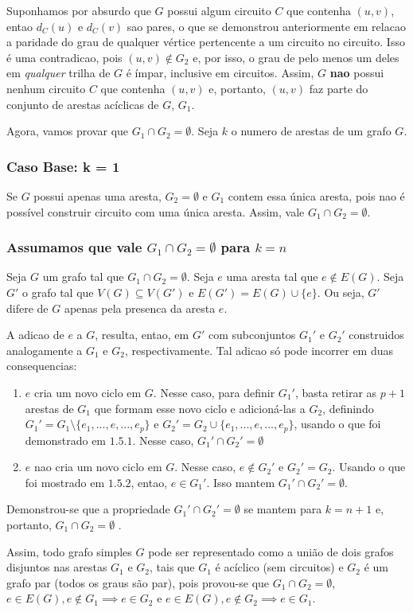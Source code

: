 \documentclass{article}
\begin{document}
Suponhamos por absurdo que $G$ possui algum circuito $C$ que contenha $(u,v)$, entao $d_C(u)$ e $d_C(v)$ sao pares, o que se demonstrou anteriormente em relacao a paridade do grau de qualquer vértice pertencente a um circuito no circuito. Isso é uma contradicao, pois $(u,v) \notin G_2$ e, por isso, o grau de pelo menos um deles em \textit{qualquer} trilha de $G$ é ímpar, inclusive em circuitos. Assim, $G$ \textbf{nao} possui nenhum circuito $C$ que contenha $(u,v)$ e, portanto, $(u,v)$ faz parte do conjunto de arestas acíclicas de $G$, $G_1$.


Agora, vamos provar que $ G_1 \cap G_2 = \emptyset $. Seja $k$ o numero de arestas de um grafo $G$. 

\subsubsection{Caso Base: k = 1}

Se $G$ possui apenas uma aresta, $G_2 = \emptyset$ e $G_1$ contem essa única aresta, pois nao é possível construir circuito com uma única aresta. Assim, vale $G_1 \cap G_2 = \emptyset$.


\subsubsection{Assumamos que  vale $G_1 \cap G_2 = \emptyset$ para $k = n$}

Seja $G$ um grafo tal que  $G_1 \cap G_2 = \emptyset$. Seja $e$ uma aresta tal que $e \notin E(G)$. Seja $G'$ o grafo tal que $V(G) \subseteq V(G')$ e $E(G') = E(G) \cup \{e\} $. Ou seja, $G'$  difere de $G$ apenas pela presenca da aresta $e$.

A adicao de $e$ a $G$, resulta, entao, em $G'$ com subconjuntos $G_1'$ e $G_2'$ construidos analogamente a $G_1$ e $G_2$, respectivamente. Tal adicao só pode incorrer em duas consequencias:

\begin{enumerate}[i]
	\item $e$ cria um novo ciclo em $G$. Nesse caso, para definir $G_1'$, basta retirar as $p + 1$ arestas de $G_1$ que formam esse novo ciclo e adicioná-las a $G_2$,  definindo $G_1' = G_1 \setminus \{e_1, ..., e, ..., e_p\}$ e  $G_2' = G_2 \cup \{e_1, ..., e, ..., e_p\}$, usando o que foi demonstrado em $1.5.1$. Nesse caso,  $G_1' \cap G_2' = \emptyset$
	
	\item $e$ nao cria um novo ciclo em $G$. Nesse caso, $e \notin G_2'$ e $G_2' = G_2$. Usando o que foi mostrado em $1.5.2$, entao, $e \in G_1'$. Isso mantem $G_1' \cap G_2' = \emptyset$. 
 \end{enumerate}
 
 Demonstrou-se que a propriedade $G_1' \cap G_2' = \emptyset$  se mantem para $k = n + 1$ e, portanto, $G_1 \cap G_2 = \emptyset$ .
 
 
Assim, todo grafo simples $G$ pode ser representado como a união de dois grafos disjuntos nas arestas $G_1$ e $G_2$, tais que $G_1$ é acíclico (sem circuitos) e $G_2$ é um grafo par (todos os graus são par),  pois   provou-se que $G_1 \cap G_2 = \emptyset$, $e \in E(G), e \notin G_1 \implies e  \in G_2 $ e $e \in E(G), e \notin G_2\implies e  \in G_1 $.
\end{document}
